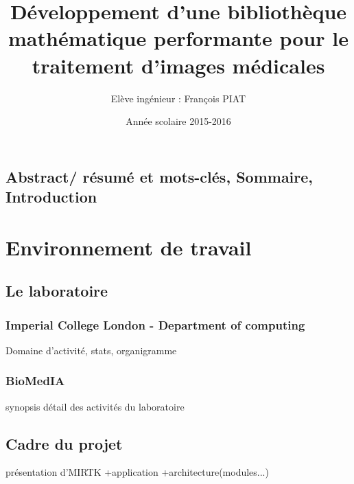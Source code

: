 \documentclass[12pt]{report}
\title{Développement d'une bibliothèque mathématique performante pour le traitement d'images médicales}
\author{Elève ingénieur : François PIAT}
\date{Année scolaire 2015-2016}
\begin{document}
	
\maketitle
\section*{Abstract/ résumé et mots-clés, Sommaire, Introduction} %

\chapter{Environnement de travail} 
	\section{Le laboratoire}
	\subsection{Imperial College London - Department of computing}
	Domaine d'activité, stats, organigramme
	\subsection{BioMedIA}
	synopsis
	détail des activités du laboratoire
	
%
%
%

	\section{Cadre du projet} présentation d'MIRTK +application +architecture(modules...)
\end{document}
